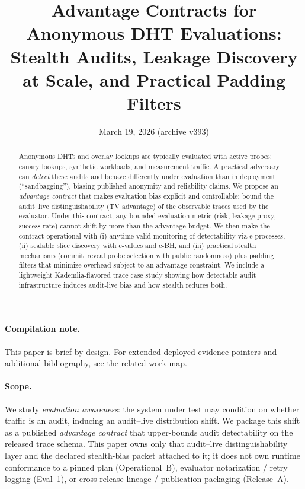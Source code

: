 \documentclass[11pt]{article}
\title{Advantage Contracts for Anonymous DHT Evaluations:\\
Stealth Audits, Leakage Discovery at Scale, and Practical Padding Filters}
\author{}
\date{March 19, 2026 (archive v393)}
\begin{document}
\maketitle

\begin{abstract}
Anonymous DHTs and overlay lookups are typically evaluated with active probes: canary lookups, synthetic workloads, and measurement traffic.
A practical adversary can \emph{detect} these audits and behave differently under evaluation than in deployment (``sandbagging''),
biasing published anonymity and reliability claims.
We propose an \emph{advantage contract} that makes evaluation bias explicit and controllable:
bound the audit--live distinguishability (TV advantage) of the observable traces used by the evaluator.
Under this contract, any bounded evaluation metric (risk, leakage proxy, success rate) cannot shift by more than the advantage budget.
We then make the contract operational with (i) anytime-valid monitoring of detectability via e-processes, (ii) scalable slice discovery with e-values and e-BH,
and (iii) practical stealth mechanisms (commit--reveal probe selection with public randomness) plus padding filters that minimize overhead subject to an advantage constraint.
We include a lightweight Kademlia-flavored trace case study showing how detectable audit infrastructure induces audit-live bias and how stealth reduces both.
\end{abstract}

\paragraph{Compilation note.}
This paper is brief-by-design. For extended deployed-evidence pointers and additional bibliography, see the related work map.\cite{series:relatedwork}

\paragraph{Scope.}
We study \emph{evaluation awareness}: the system under test may condition on whether traffic is an audit, inducing an audit--live distribution shift.
We package this shift as a published \emph{advantage contract} that upper-bounds audit detectability on the released trace schema.
This paper owns only that audit--live distinguishability layer and the declared stealth-bias packet attached to it; it does not own runtime conformance to a pinned plan (Operational~B), evaluator notarization / retry logging (Eval~1), or cross-release lineage / publication packaging (Release~A).
\end{document}
